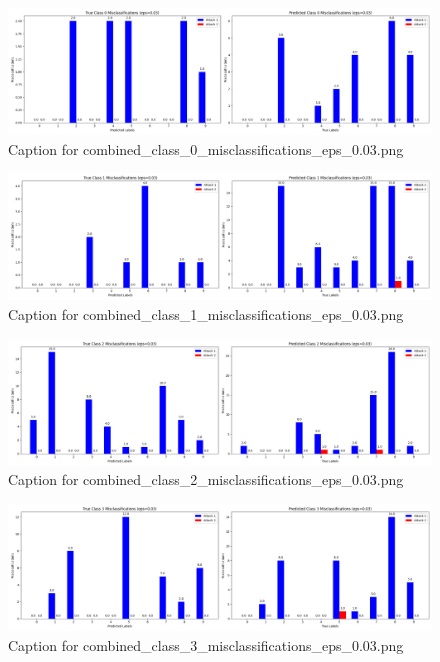 \documentclass[11pt,onside]{article}
\begin{document}
\begin{figure}[ht]
\centering
\includegraphics[width=1\textwidth]{combined_class_boundary_pgd/combined_class_0_misclassifications_eps_0.03.png}
\caption{Caption for combined_class_0_misclassifications_eps_0.03.png}
\label{fig:combined_class_0_misclassifications_eps_0.03.png}
\end{figure}

\begin{figure}[ht]
\centering
\includegraphics[width=1\textwidth]{combined_class_boundary_pgd/combined_class_1_misclassifications_eps_0.03.png}
\caption{Caption for combined_class_1_misclassifications_eps_0.03.png}
\label{fig:combined_class_1_misclassifications_eps_0.03.png}
\end{figure}

\begin{figure}[ht]
\centering
\includegraphics[width=1\textwidth]{combined_class_boundary_pgd/combined_class_2_misclassifications_eps_0.03.png}
\caption{Caption for combined_class_2_misclassifications_eps_0.03.png}
\label{fig:combined_class_2_misclassifications_eps_0.03.png}
\end{figure}

\begin{figure}[ht]
\centering
\includegraphics[width=1\textwidth]{combined_class_boundary_pgd/combined_class_3_misclassifications_eps_0.03.png}
\caption{Caption for combined_class_3_misclassifications_eps_0.03.png}
\label{fig:combined_class_3_misclassifications_eps_0.03.png}
\end{figure}
\end{document}
